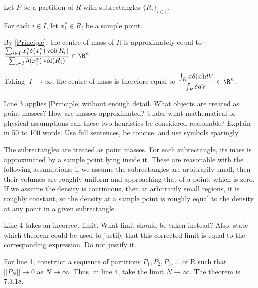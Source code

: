 \documentclass{exam}
\DeclareMathOperator{\Vol}{vol} %
\begin{document}
\begin{questions}
\begin{lines}
	\item Let $P$ be a partition of $R$ with subrectangles $\{R_i\}_{i \in I}$.
	\item For each $i \in I$, let $x_i^* \in R_i$ be a sample point. 
	\item By \eqref{Principle}, the centre of mass of $R$ is approximately equal to $\dfrac{\sum_{i \in I} x_i^* \delta(x_i^*) \Vol(R_i)  }{ \sum_{i\in I} \delta(x_i^*) \Vol(R_i)} \in \R^n$. 
	\item Taking $|I| \to \infty$, the centre of mass is therefore equal to $\dfrac{\int_R x \delta(x) dV }{\int_R  \delta dV} \in \R^n$.
\end{lines}
\begin{parts}
	\item  Line 3 applies \eqref{Principle} without enough detail. What objects are treated as point masses? How are masses approximated? Under what mathematical or physical assumptions can these two heuristics be considered reasonable? Explain in 50 to 100 words. Use full sentences, be concise, and use symbols sparingly.
	
\begin{answer}{260pt}
The subrectangles are treated as point masses. For each subrectangle, its mass is approximated by a sample point lying inside it. These are reasonable with the following assumptions: if we assume the subrectangles are arbitrarily small, then their volumes are roughly uniform and approaching that of a point, which is zero. If we assume the density is continuous, then at arbitrarily small regions, it is roughly constant, so the density at a sample point is roughly equal to the density at any point in a given subrectangle.
\end{answer}
	
	\item Line 4 takes an incorrect limit. What limit should be taken instead? Also, state which theorem could be used to justify that this corrected limit is equal to the corresponding expression. Do not justify it. 

\begin{answer}{60pt}
For line 1, construct a sequence of partitions $P_1, P_2, P_3, ...$ of R such that $|| P_N || \to 0$ as $N \to \infty$. Thus, in line 4, take the limit $N \to \infty$. The theorem is 7.3.18.
\end{answer}



\end{parts}
\end{questions}
\end{document}
